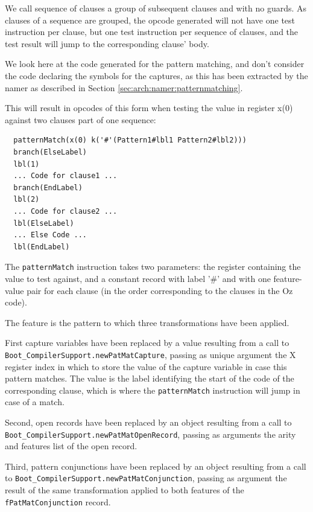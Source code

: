 \documentclass[a4paper]{memoir}
\begin{document}
We call sequence of clauses  a group of subsequent clauses and with no guards.
As clauses of a sequence are grouped, the opcode generated will not
have one test instruction per clause, but one test instruction
per sequence of clauses, and the test result will jump to the corresponding clause' body.

We look here at the code generated for the pattern matching, and don't consider
the code declaring the symbols for the captures, as this has been extracted by
the namer as described in Section \ref{sec:arch:namer:patternmatching}.

This will result in opcodes of this form when testing the value in register x(0) against two clauses part of one sequence:
\begin{lstlisting}
  patternMatch(x(0) k('#'(Pattern1#lbl1 Pattern2#lbl2)))
  branch(ElseLabel)
  lbl(1)
  ... Code for clause1 ...
  branch(EndLabel)
  lbl(2)
  ... Code for clause2 ...
  lbl(ElseLabel)
  ... Else Code ...
  lbl(EndLabel)
\end{lstlisting}



The \lstinline!patternMatch! instruction takes two parameters: the register containing the
value to test against, and a constant record with label '\#' and with one
feature-value pair for each clause (in the order corresponding to the clauses in the Oz code). 

The feature is the pattern to which three transformations have been applied. 

First capture variables have been replaced by a value resulting from a call to
\lstinline!Boot_CompilerSupport.newPatMatCapture!, passing as unique argument
the X register index in which to store the value of the capture variable in
case this pattern matches. The value is the label identifying the start of the
code of the corresponding clause, which is where the \lstinline!patternMatch! instruction
will jump in case of a match.

Second, open records have been replaced by an object resulting from a
call to \lstinline!Boot_CompilerSupport.newPatMatOpenRecord!, passing as
arguments the arity and features list of the open record.

Third, pattern conjunctions have been replaced by an object resulting from a call 
to \lstinline!Boot_CompilerSupport.newPatMatConjunction!, passing as argument the result
of the same transformation applied to both features of the \lstinline!fPatMatConjunction! record.
\end{document}
